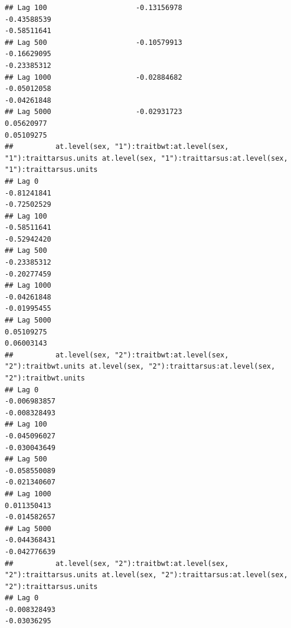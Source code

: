 \documentclass[
  12pt,
]{book}
\begin{document}
\begin{verbatim}
## Lag 100                     -0.13156978                                                   -0.43588539                                                      -0.58511641
## Lag 500                     -0.10579913                                                   -0.16629095                                                      -0.23385312
## Lag 1000                    -0.02884682                                                   -0.05012058                                                      -0.04261848
## Lag 5000                    -0.02931723                                                    0.05620977                                                       0.05109275
##          at.level(sex, "1"):traitbwt:at.level(sex, "1"):traittarsus.units at.level(sex, "1"):traittarsus:at.level(sex, "1"):traittarsus.units
## Lag 0                                                         -0.81241841                                                         -0.72502529
## Lag 100                                                       -0.58511641                                                         -0.52942420
## Lag 500                                                       -0.23385312                                                         -0.20277459
## Lag 1000                                                      -0.04261848                                                         -0.01995455
## Lag 5000                                                       0.05109275                                                          0.06003143
##          at.level(sex, "2"):traitbwt:at.level(sex, "2"):traitbwt.units at.level(sex, "2"):traittarsus:at.level(sex, "2"):traitbwt.units
## Lag 0                                                     -0.006983857                                                     -0.008328493
## Lag 100                                                   -0.045096027                                                     -0.030043649
## Lag 500                                                   -0.058550089                                                     -0.021340607
## Lag 1000                                                   0.011350413                                                     -0.014582657
## Lag 5000                                                  -0.044368431                                                     -0.042776639
##          at.level(sex, "2"):traitbwt:at.level(sex, "2"):traittarsus.units at.level(sex, "2"):traittarsus:at.level(sex, "2"):traittarsus.units
## Lag 0                                                        -0.008328493                                                         -0.03036295

\end{verbatim}
\end{document}
